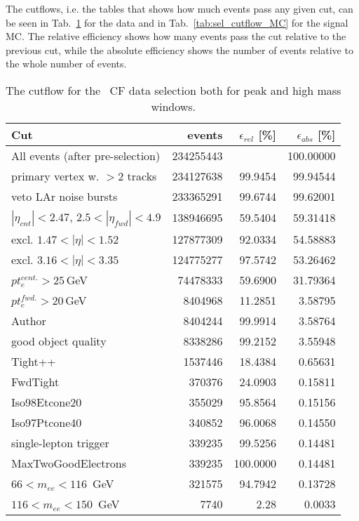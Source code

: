 The cutflows, i.e. the tables that shows how much events pass any given cut, can be seen in Tab.~\ref{tab:sel_cutflow_data} for the data and in Tab.~\ref{tab:sel_cutflow_MC} for the signal MC. The relative efficiency shows how many events pass the cut relative to the previous cut, while the absolute efficiency shows the number of events relative to the whole number of events.

\begin{table}
\centering
\begin{tabular}{@{}lrrr@{}} \hline \hline
 Cut & events & $\epsilon_{rel}$ [\%] & $\epsilon_{abs}$ [\%] \\\hline
 All events (after pre-selection)  &    234255443 & &   100.00000 \\
 primary vertex w. $>2$ tracks &    234127638 &     99.9454 &    99.94544 \\
 veto LAr noise bursts & 233365291 &     99.6744 &    99.62001 \\
$|\eta_{cnt}| < 2.47$, $2.5<|\eta_{fwd}|<4.9$ &    138946695 &     59.5404 &    59.31418 \\
excl. $1.47 < |\eta| < 1.52$ &    127877309 &     92.0334 &    54.58883 \\
excl. $3.16 < |\eta| < 3.35$ &    124775277 &     97.5742 &    53.26462 \\
$pt_{e}^{cent.} > 25$\,GeV &    74478333 &     59.6900 &    31.79364 \\
$pt_{e}^{fwd.} > 20$\,GeV &      8404968 &     11.2851 &     3.58795 \\
Author &     8404244 &     99.9914 &     3.58764 \\
good object quality &     8338286 &     99.2152 &     3.55948 \\
 Tight++ &      1537446 &     18.4384 &     0.65631 \\
 FwdTight &       370376 &     24.0903 &     0.15811 \\
 Iso98Etcone20 &       355029 &     95.8564 &     0.15156 \\
 Iso97Ptcone40 &       340852 &     96.0068 &     0.14550 \\
 single-lepton trigger &       339235 &     99.5256 &     0.14481 \\
 MaxTwoGoodElectrons &       339235 &    100.0000 &     0.14481 \\\hline
 $66 < m_{ee} < 116$~GeV &       321575 &     94.7942 &     0.13728 \\
 $116 < m_{ee} < 150$~GeV &         7740 &        2.28 &     0.0033 \\ \hline \hline
\end{tabular}
\caption{The cutflow for the \Zee\ CF data selection both for peak and high mass windows.}
\label{tab:sel_cutflow_data}
\end{table}

